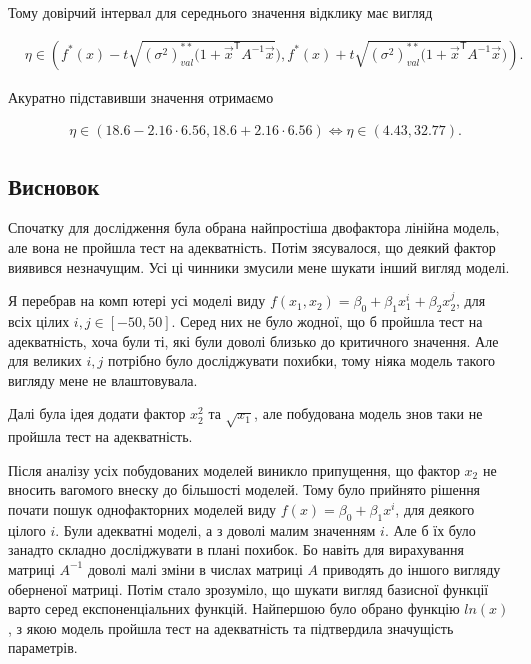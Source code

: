 \documentclass[14pt,a4paper]{scrartcl}
\theoremstyle{definition}
\theoremstyle{remark}
\theoremstyle{definition}
\theoremstyle{definition}
\begin{document}
Тому довірчий інтервал для середнього значення відклику має вигляд

\begin{align*}
  & \eta \in \left( f^{*}(x) - t\sqrt{(\sigma^2)^{**}_{val} (1 + \vec{x}^\mathsf{T} A^{-1} \vec{x}}), f^{*}(x) + t\sqrt{(\sigma^2)^{**}_{val} (1 + \vec{x}^\mathsf{T} A^{-1} \vec{x}})  \right).
\end{align*}

Акуратно підставивши значення отримаємо

\begin{align*}
  & \eta \in \left( 18.6 - 2.16 \cdot 6.56, 18.6 + 2.16 \cdot 6.56  \right) \Leftrightarrow \eta \in \left( 4.43, 32.77  \right).
\end{align*}

\subsection{Висновок}

Спочатку для дослідження була обрана найпростіша двофактора лінійна модель, але вона не пройшла тест на адекватність. Потім з\textquotesingle ясувалося, що деякий фактор виявився незначущим. Усі ці чинники змусили мене шукати інший вигляд моделі.

Я перебрав на комп \textquotesingle ютері усі моделі виду $f(x_{1}, x_{2}) = \beta_{0} + \beta_{1} x_{1}^{i} + \beta_{2} x_{2}^{j}$, для всіх цілих $i, j \in [-50, 50]$. Серед них не було жодної, що б пройшла тест на адекватність, хоча були ті, які були доволі близько до критичного значення. Але для великих $i, j$ потрібно було досліджувати похибки, тому ніяка модель такого вигляду мене не влаштовувала.

Далі була ідея додати фактор $x_{2}^{2}$ та $\sqrt{x_{1}}$, але побудована модель знов таки не пройшла тест на адекватність.

Після аналізу усіх побудованих моделей виникло припущення, що фактор $x_{2}$ не вносить вагомого внеску до більшості моделей. Тому було прийнято рішення почати пошук однофакторних моделей виду $f(x) = \beta_{0} + \beta_{1} x^{i}$, для деякого цілого $i$. Були адекватні моделі, а з доволі малим значенням $i$. Але б їх було занадто складно досліджувати в плані похибок. Бо навіть для вирахування матриці $A^{-1}$ доволі малі зміни в числах матриці $A$ приводять до іншого вигляду оберненої матриці. Потім стало зрозуміло, що шукати вигляд базисної функції варто серед експоненціальних функцій. Найпершою було обрано функцію $ln(x)$, з якою модель пройшла тест на адекватність та підтвердила значущість параметрів.

\nocite{*}


\end{document}
